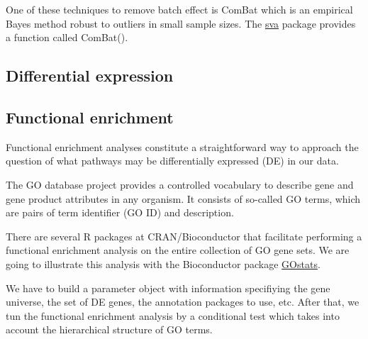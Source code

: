 \documentclass[9pt,twocolumn,twoside]{gsajnl}
\begin{document}
One of these techniques to remove batch effect is ComBat which is an empirical Bayes method robust to outliers in small sample sizes. The \href{http://www.bioconductor.org/packages/release/bioc/html/sva.html}{sva} package provides a function called ComBat().


\subsection*{Differential expression}

\subsection*{Functional enrichment}
Functional enrichment analyses constitute a straightforward way to approach the question of what pathways may be differentially expressed (DE) in our data.

The GO database project provides a controlled vocabulary to describe gene and gene product attributes in any organism. It consists of so-called GO terms, which are pairs of term identifier (GO ID) and description.

There are several R packages at CRAN/Bioconductor that facilitate performing a functional enrichment analysis on the entire collection of GO gene sets. We are going to illustrate this analysis with the Bioconductor package \href{http://www.bioconductor.org/packages/release/bioc/html/GOstats.html}{GOstats}.

We have to build a parameter object with information specifiying the gene universe, the set of DE genes, the annotation packages to use, etc. After that, we tun the functional enrichment analysis by a conditional test which takes into account the hierarchical structure of GO terms.


\end{document}

